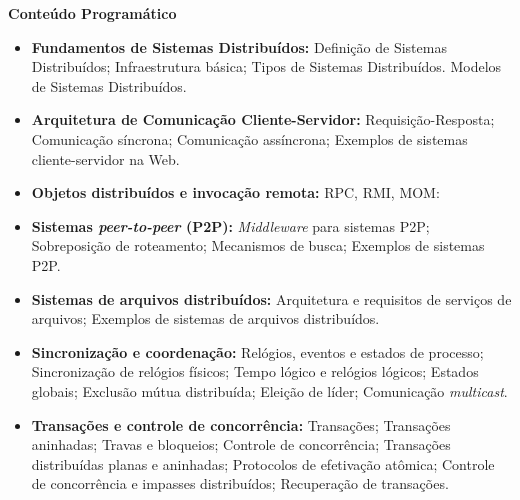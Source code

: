 
\begin{snugshade}\begin{center}\textbf{
    Conteúdo Programático
}\end{center}\end{snugshade}

\begin{itemize}

 \item \textbf{Fundamentos de Sistemas Distribuídos:} Definição de Sistemas Distribuídos; Infraestrutura básica; Tipos de Sistemas Distribuídos. Modelos de Sistemas Distribu\'idos.


 \item \textbf{Arquitetura de Comunicação Cliente-Servidor:} Requisição-Resposta; Comunicação síncrona; Comunicação assíncrona; Exemplos de sistemas cliente-servidor na Web.
  
 \item \textbf{Objetos distribu\'idos e invoca\c{c}\~ao remota:} RPC, RMI, MOM:

 \item \textbf{Sistemas \textit{peer-to-peer} (P2P):} \textit{Middleware} para sistemas P2P; Sobreposi\c{c}\~ao de roteamento; Mecanismos de busca; Exemplos de sistemas P2P.

 \item \textbf{Sistemas de arquivos distribuídos:} Arquitetura e requisitos de servi\c{c}os de arquivos; Exemplos de sistemas de arquivos distribu\'idos.

 \item \textbf{Sincronização e coordena\c{c}\~ao:} Rel\'ogios, eventos e estados de processo; Sincroniza\c{c}\~ao de rel\'ogios f\'isicos; Tempo l\'ogico e rel\'ogios l\'ogicos; Estados globais; Exclus\~ao m\'utua distribu\'ida; Elei\c{c}\~ao de l\'ider; Comunica\c{c}\~ao \textit{multicast}.

 \item \textbf{Transações e controle de concorr\^encia:} Transa\c{c}\~oes; Transa\c{c}\~oes aninhadas; Travas e bloqueios; Controle de concorr\^encia; Transa\c{c}\~oes distribu\'idas planas e aninhadas; Protocolos de efetiva\c{c}\~ao at\^omica; Controle de concorr\^encia e impasses distribu\'idos; Recupera\c{c}\~ao de transa\c{c}\~oes.


\end{itemize}
